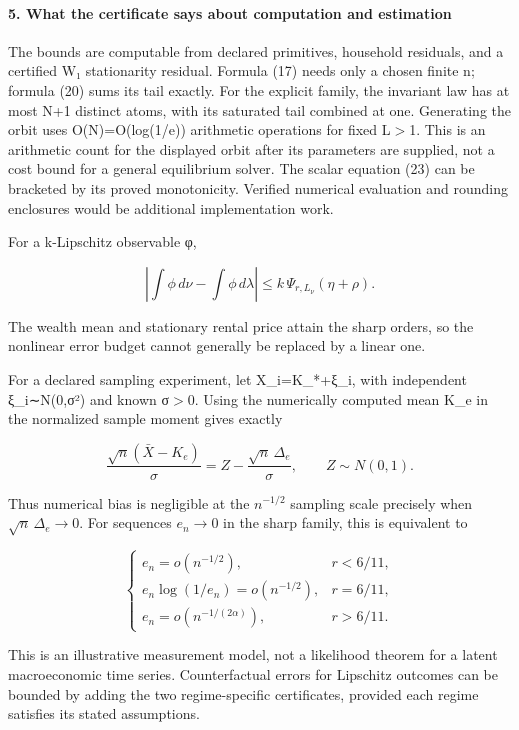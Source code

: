 \documentclass{article}
\begin{document}
\paragraph{5. What the certificate says about computation and estimation}

The bounds are computable from declared primitives, household residuals, and a certified W₁ stationarity residual. Formula (17) needs only a chosen finite n; formula (20) sums its tail exactly. For the explicit family, the invariant law has at most N+1 distinct atoms, with its saturated tail combined at one. Generating the orbit uses O(N)=O(log(1/e)) arithmetic operations for fixed L\(\gt\)1. This is an arithmetic count for the displayed orbit after its parameters are supplied, not a cost bound for a general equilibrium solver. The scalar equation (23) can be bracketed by its proved monotonicity. Verified numerical evaluation and rounding enclosures would be additional implementation work.

For a k-Lipschitz observable φ,

\[
\left|\int\phi\,d\nu-\int\phi\,d\lambda\right|
\le k\,\Psi_{r,L_\nu}(\eta+\rho).
\]

The wealth mean and stationary rental price attain the sharp orders, so the nonlinear error budget cannot generally be replaced by a linear one.

For a declared sampling experiment, let X\_i=K\_*+ξ\_i, with independent ξ\_i∼N(0,σ²) and known σ\(\gt\)0. Using the numerically computed mean K\_e in the normalized sample moment gives exactly

\[
\frac{\sqrt n(\bar X-K_e)}{\sigma}
=Z-\frac{\sqrt n\,\Delta_e}{\sigma},
\qquad Z\sim N(0,1).
\]

Thus numerical bias is negligible at the \(n^{-1/2}\) sampling scale precisely when \(\sqrt n\,\Delta_e\to0\). For sequences \(e_n\to0\) in the sharp family, this is equivalent to

\[
\begin{cases}
e_n=o(n^{-1/2}),&r<6/11,\\
e_n\log(1/e_n)=o(n^{-1/2}),&r=6/11,\\
e_n=o(n^{-1/(2\alpha)}),&r>6/11.
\end{cases}
\]

This is an illustrative measurement model, not a likelihood theorem for a latent macroeconomic time series. Counterfactual errors for Lipschitz outcomes can be bounded by adding the two regime-specific certificates, provided each regime satisfies its stated assumptions.
\end{document}

